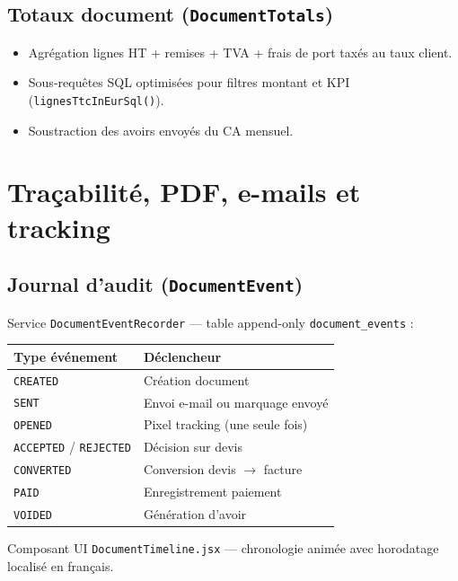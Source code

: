 \documentclass[11pt,a4paper]{report}
\newcommand{\svc}[1]{\texttt{\small #1}}
\newcommand{\model}[1]{\texttt{\small #1}}
\begin{document}
\section{Totaux document (\svc{DocumentTotals})}

\begin{itemize}[leftmargin=*]
    \item Agrégation lignes HT + remises + TVA + frais de port taxés au taux client.
    \item Sous-requêtes SQL optimisées pour filtres montant et KPI (\texttt{lignesTtcInEurSql()}).
    \item Soustraction des avoirs envoyés du CA mensuel.
\end{itemize}

\chapter{Traçabilité, PDF, e-mails et tracking}

\section{Journal d'audit (\model{DocumentEvent})}

Service \svc{DocumentEventRecorder} — table append-only \texttt{document\_events} :

\begin{center}
\begin{tabular}{@{}ll@{}}
\toprule
\textbf{Type événement} & \textbf{Déclencheur} \\
\midrule
\texttt{CREATED} & Création document \\
\texttt{SENT} & Envoi e-mail ou marquage envoyé \\
\texttt{OPENED} & Pixel tracking (une seule fois) \\
\texttt{ACCEPTED} / \texttt{REJECTED} & Décision sur devis \\
\texttt{CONVERTED} & Conversion devis $\rightarrow$ facture \\
\texttt{PAID} & Enregistrement paiement \\
\texttt{VOIDED} & Génération d'avoir \\
\bottomrule
\end{tabular}
\end{center}

Composant UI \texttt{DocumentTimeline.jsx} — chronologie animée avec horodatage localisé en français.
\end{document}
